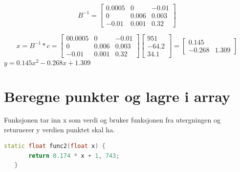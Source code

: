 \documentclass[a4paper,norsk]{article}
\begin{document}
\begin{equation*}
B^{-1} = \begin{bmatrix} 0.0005  & 0 & -0.01\\ 0 & 0.006 & 0.003 \\ -0.01 & 0.001 & 0.32 \end{bmatrix}
\end{equation*}

\begin{equation*}
x = B^{-1} * c = \begin{bmatrix} 00.0005  & 0 & -0.01\\ 0 & 0.006 & 0.003 \\ -0.01 & 0.001 & 0.32  \end{bmatrix}\begin{bmatrix} 951 \\ -64.2 \\ 34.1\end{bmatrix}
= \begin{bmatrix}0.145  \\ -0.268 & 1.309 \end{bmatrix}
\end{equation*}
$y = 0.145x^{2}-0.268x+1.309$
\section{Beregne punkter og lagre i array}
Funksjonen tar inn x som verdi og bruker funksjonen fra utergningen og returnerer y verdien punktet skal ha.
\begin{lstlisting}[language=C++, caption={trianglesurface.h}]
static float func2(float x) {
       return 0.174 * x + 1, 743;
   }
\end{lstlisting}
\end{document}
